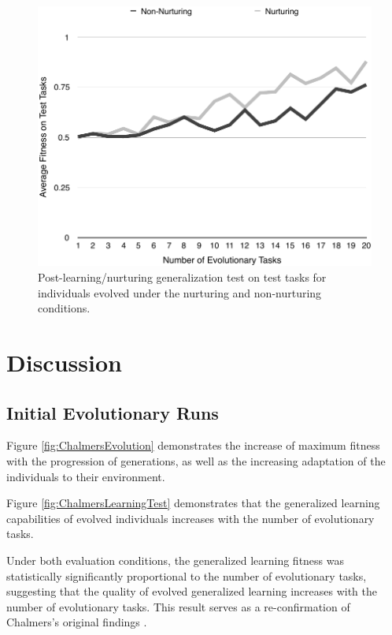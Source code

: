 \documentclass[master]{outhesis}
\begin{document}
\begin{figure}[H]
	\centering
	\includegraphics{NurturingGeneralizationTestPlot.pdf}
	\caption{Post-learning/nurturing generalization test on test tasks for individuals evolved under the nurturing and non-nurturing conditions.}
\end{figure}

\chapter{Discussion}

\section{Initial Evolutionary Runs}

Figure \ref{fig:ChalmersEvolution} demonstrates the increase of maximum fitness with the progression of generations,
as well as the increasing adaptation of the individuals to their environment.

Figure \ref{fig:ChalmersLearningTest} demonstrates that the generalized learning capabilities of evolved individuals increases with the number of evolutionary tasks.

Under both evaluation conditions, the generalized learning fitness was statistically significantly proportional to the number of evolutionary tasks, suggesting that the quality of evolved generalized learning increases with the number of evolutionary tasks.
This result serves as a re-confirmation of Chalmers's original findings \citep{Chalmers:1990aa}.
\end{document}
